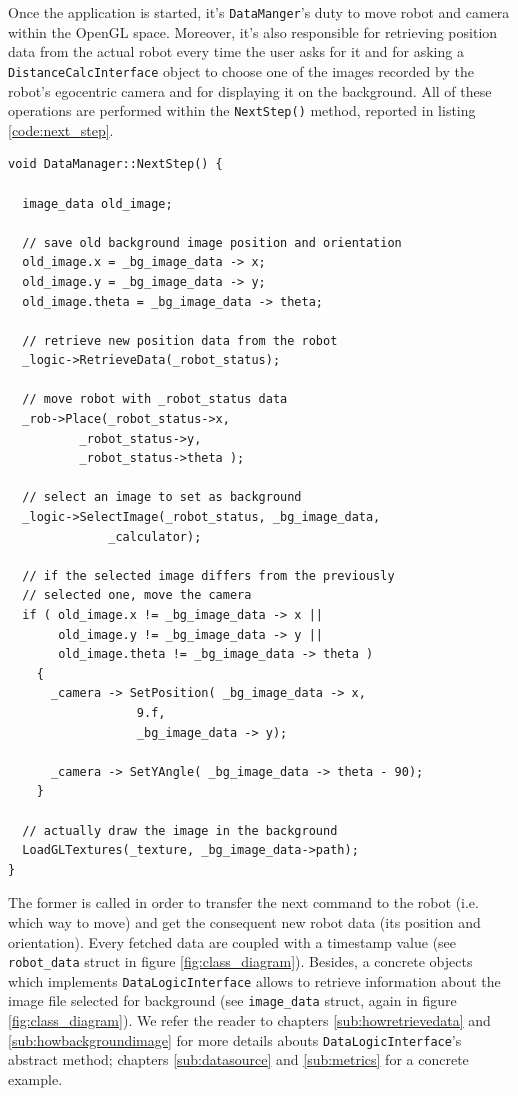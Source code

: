 %
Once the application is started, it's \texttt{DataManger}'s duty 
to move robot and camera within the OpenGL space. Moreover, 
it's also responsible for retrieving position data from the actual robot
every time the user asks for it and for asking a \texttt{DistanceCalcInterface}
object to choose one of the images recorded by the robot's 
egocentric camera and for displaying it on the background. 
All of these operations are performed within the \texttt{NextStep()}
method, reported in listing \ref{code:next_step}.
%
\begin{lstlisting}[caption={The \texttt{DataManager::NextStep()} method}, label={code:next_step}, frame=trBL]
void DataManager::NextStep() {

  image_data old_image;

  // save old background image position and orientation
  old_image.x = _bg_image_data -> x;
  old_image.y = _bg_image_data -> y;
  old_image.theta = _bg_image_data -> theta;
  
  // retrieve new position data from the robot
  _logic->RetrieveData(_robot_status);

  // move robot with _robot_status data
  _rob->Place(_robot_status->x,
	      _robot_status->y,
	      _robot_status->theta ); 
    
  // select an image to set as background
  _logic->SelectImage(_robot_status, _bg_image_data,
		      _calculator);

  // if the selected image differs from the previously
  // selected one, move the camera
  if ( old_image.x != _bg_image_data -> x ||
       old_image.y != _bg_image_data -> y ||
       old_image.theta != _bg_image_data -> theta )
    {
      _camera -> SetPosition( _bg_image_data -> x,
			      9.f,
			      _bg_image_data -> y);
      
      _camera -> SetYAngle( _bg_image_data -> theta - 90);
    }

  // actually draw the image in the background
  LoadGLTextures(_texture, _bg_image_data->path);
}
\end{lstlisting}
%
%

%
The former is called in order to transfer the next command to the robot (i.e. which way to move) and get the
consequent new robot data (its position and orientation). Every fetched data are coupled with a timestamp value
(see \texttt{robot\_data} struct in figure \ref {fig:class_diagram}). Besides, a concrete objects which implements
\texttt{DataLogicInterface} allows to retrieve information about the image file selected for background
(see \texttt{image\_data} struct, again in figure \ref {fig:class_diagram}). We refer the reader to chapters
\ref{sub:howretrievedata} and \ref{sub:howbackgroundimage} for more details abouts \texttt{DataLogicInterface}'s
abstract method; chapters \ref{sub:datasource} and \ref{sub:metrics} for a concrete example.
%

